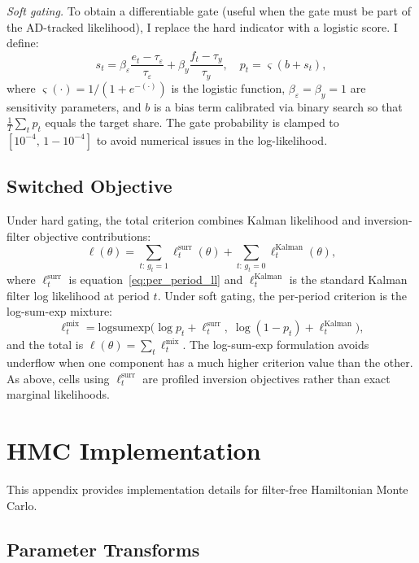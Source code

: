 \documentclass[12pt]{article}
\theoremstyle{plain}
\theoremstyle{definition}
\theoremstyle{remark}
\begin{document}
\textit{Soft gating.} To obtain a differentiable gate (useful when the gate must be part of the AD-tracked likelihood), I replace the hard indicator with a logistic score. I define:
\begin{equation}
s_t = \beta_\varepsilon \frac{e_t - \tau_\varepsilon}{\tau_\varepsilon} + \beta_y \frac{f_t - \tau_y}{\tau_y}, \quad p_t = \varsigma(b + s_t),
\end{equation}
where $\varsigma(\cdot) = 1/(1+e^{-(\cdot)})$ is the logistic function, $\beta_\varepsilon = \beta_y = 1$ are sensitivity parameters, and $b$ is a bias term calibrated via binary search so that $\frac{1}{T}\sum_t p_t$ equals the target share. The gate probability is clamped to $[10^{-4},\, 1 - 10^{-4}]$ to avoid numerical issues in the log-likelihood.


\subsection{Switched Objective}

Under hard gating, the total criterion combines Kalman likelihood and inversion-filter objective contributions:
\begin{equation}
\ell(\theta) = \sum_{t:\, g_t = 1} \ell_t^{\text{surr}}(\theta) + \sum_{t:\, g_t = 0} \ell_t^{\text{Kalman}}(\theta),
\end{equation}
where $\ell_t^{\text{surr}}$ is equation~\eqref{eq:per_period_ll} and $\ell_t^{\text{Kalman}}$ is the standard Kalman filter log likelihood at period $t$. Under soft gating, the per-period criterion is the log-sum-exp mixture:
\begin{equation}
\ell_t^{\text{mix}} = \text{logsumexp}\!\bigl(\log p_t + \ell_t^{\text{surr}},\; \log(1 - p_t) + \ell_t^{\text{Kalman}}\bigr),
\end{equation}
and the total is $\ell(\theta) = \sum_t \ell_t^{\text{mix}}$. The log-sum-exp formulation avoids underflow when one component has a much higher criterion value than the other. As above, cells using $\ell_t^{\text{surr}}$ are profiled inversion objectives rather than exact marginal likelihoods.


\section{HMC Implementation}
\label{app:hmc}

This appendix provides implementation details for filter-free Hamiltonian Monte Carlo.


\subsection{Parameter Transforms}
\label{app:param_transforms}
\end{document}
